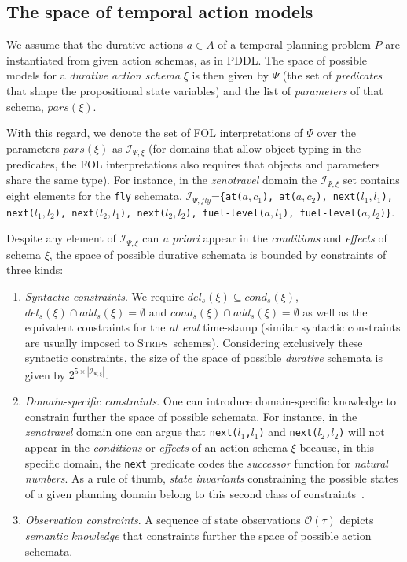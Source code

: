 \documentclass[letterpaper]{article} %
\newcommand{\strips}{\textsc{Strips}}     %
\begin{document}
\subsection{The space of temporal action models}
We assume that the durative actions $a\in A$ of a temporal planning problem $P$ are instantiated from given action schemas, as in PDDL. The space of possible models for a {\em durative action schema} $\xi$ is then given by $\Psi$ (the set of {\em predicates} that shape the propositional state variables) and the list of {\em parameters} of that schema, $pars(\xi)$.

With this regard, we denote the set of FOL interpretations of $\Psi$ over the parameters $pars(\xi)$ as ${\mathcal I}_{\Psi,\xi}$ (for domains that allow object typing in the predicates, the FOL interpretations also requires that objects and parameters share the same type). For instance, in the {\em zenotravel} domain the ${\mathcal I}_{\Psi,\xi}$ set contains eight elements for the {\small\tt fly} schemata, ${\mathcal I}_{\Psi,fly}$={\small\tt\{at($a,c_1$), at($a,c_2$), next($l_1,l_1$), next($l_1,l_2$), next($l_2,l_1$), next($l_2,l_2$), fuel-level($a,l_1$), fuel-level($a,l_2$)\}}. 

Despite any element of ${\mathcal I}_{\Psi,\xi}$ can {\em a priori} appear in the {\em conditions} and {\em effects} of schema $\xi$, the space of possible durative schemata is bounded by constraints of three kinds:
\begin{enumerate}
\item {\em Syntactic constraints}. We require $del_s(\xi)\subseteq cond_s(\xi)$, $del_s(\xi)\cap add_s(\xi)=\emptyset$ and $cond_s(\xi)\cap add_s(\xi)=\emptyset$ as well as the equivalent constraints for the {\em at end} time-stamp (similar syntactic constraints are usually imposed to \strips\ schemes). Considering exclusively these syntactic constraints, the size of the space of possible {\em durative} schemata is given by $2^{5\times|{\mathcal I}_{\Psi,\xi}|}$. 
\item {\em Domain-specific constraints}. One can introduce domain-specific knowledge to constrain further the space of possible schemata. For instance, in the {\em zenotravel} domain one can argue that {\small\tt next($l_1$,$l_1$)} and {\small\tt next($l_2$,$l_2$)} will not appear in the {\em conditions} or {\em effects} of an action schema $\xi$ because, in this specific domain, the {\tt\small next} predicate codes the {\em successor} function for {\em natural numbers}. As a rule of thumb, {\it state invariants} constraining the possible states of a given planning domain belong to this second class of constraints~\cite{fox:TIM:JAIR1998}. 

\item {\em Observation constraints}. A sequence of state observations $\mathcal{O}(\tau)$ depicts {\em semantic knowledge} that constraints further the space of possible action schemata. 
\end{enumerate}
\end{document}
